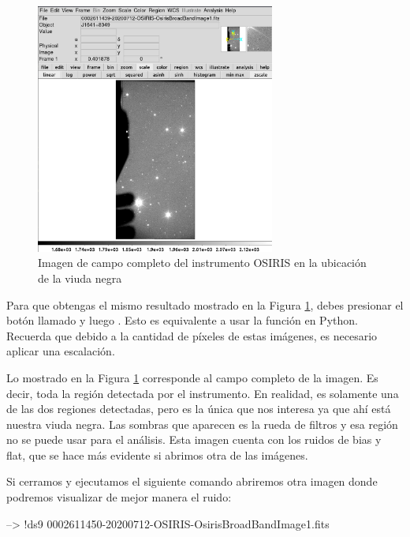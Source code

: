 \begin{figure}[htb]
  \centering
	\includegraphics[width=0.7\textwidth]{figures/ds9-campo-completo.png}
	\caption{Imagen de campo completo del instrumento OSIRIS en la ubicación de la viuda negra}
	\label{fig:ds9-campo-completo} 
\end{figure}

Para que obtengas el mismo resultado mostrado en la Figura \ref{fig:ds9-campo-completo}, debes presionar el botón llamado  y luego . Esto es equivalente a usar la función  en Python. Recuerda que debido a la cantidad de píxeles de estas imágenes, es necesario aplicar una escalación. 

Lo mostrado en la Figura \ref{fig:ds9-campo-completo} corresponde al campo completo de la imagen. Es decir, toda la región detectada por el instrumento. En realidad, es solamente una de las dos regiones detectadas, pero es la única que nos interesa ya que ahí está nuestra viuda negra. Las sombras que aparecen es la rueda de filtros y esa región no se puede usar para el análisis. Esta imagen cuenta con los ruidos de bias y flat, que se hace más evidente si abrimos otra de las imágenes. 

Si cerramos  y ejecutamos el siguiente comando abriremos otra imagen donde podremos visualizar de mejor manera el ruido:

\begin{shell}
--> !ds9 0002611450-20200712-OSIRIS-OsirisBroadBandImage1.fits
\end{shell}

